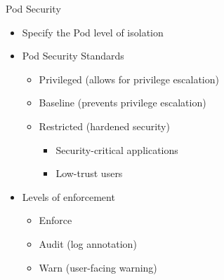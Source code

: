 \begin{frame}{Pod Security}
\begin{itemize}
\item Specify the Pod level of isolation
\item Pod Security Standards
\begin{itemize}
\item Privileged (allows for privilege escalation)
\item Baseline (prevents privilege escalation)
\item Restricted (hardened security)
\begin{itemize}
\item Security-critical applications
\item Low-trust users
\end{itemize}
\end{itemize}
\item Levels of enforcement
\begin{itemize}
\item Enforce
\item Audit (log annotation)
\item Warn (user-facing warning)
\end{itemize}
\end{itemize}
\end{frame}

